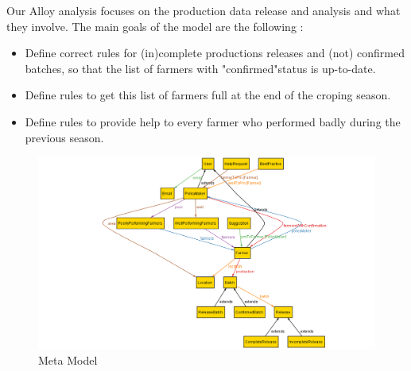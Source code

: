 Our Alloy analysis focuses on the production data release and analysis and what they involve. The main goals of the model are the following : 
\begin{itemize}[label=\textbullet]
	\item Define correct rules for (in)complete productions releases and (not) confirmed batches, so that the list of farmers with "confirmed"status is up-to-date.
	\item Define rules to get this list of farmers full at the end of the croping season.
	\item Define rules to provide help to every farmer who performed badly during the previous season.
\end{itemize}



\begin{figure} [!h]
	\centering
	\includegraphics[width=\textwidth]{Images/alloy-metamodel.png}
	\caption{\label{fig:seq} Meta Model}
\end{figure}